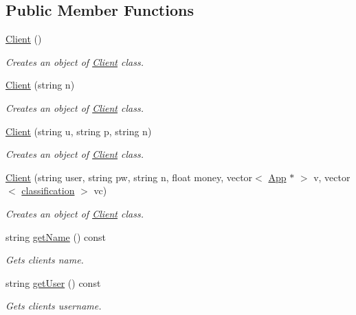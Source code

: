 \subsection*{Public Member Functions}
\begin{DoxyCompactItemize}
\item 
\hyperlink{class_client_ae51af7aa6b8f591496a8f6a4a87a14bf}{Client} ()
\begin{DoxyCompactList}\small\item\em Creates an object of \hyperlink{class_client}{Client} class. \end{DoxyCompactList}\item 
\hyperlink{class_client_aeb5b0cad9e1c7fa265fa2fc5c8811bb5}{Client} (string n)
\begin{DoxyCompactList}\small\item\em Creates an object of \hyperlink{class_client}{Client} class. \end{DoxyCompactList}\item 
\hyperlink{class_client_a937ad40db78ba6c93e742c593cf63132}{Client} (string u, string p, string n)
\begin{DoxyCompactList}\small\item\em Creates an object of \hyperlink{class_client}{Client} class. \end{DoxyCompactList}\item 
\hyperlink{class_client_a39726efcaba3fa92c1f05aa4b07b6694}{Client} (string user, string pw, string n, float money, vector$<$ \hyperlink{class_app}{App} $\ast$ $>$ v, vector$<$ \hyperlink{structclassification}{classification} $>$ vc)
\begin{DoxyCompactList}\small\item\em Creates an object of \hyperlink{class_client}{Client} class. \end{DoxyCompactList}\item 
string \hyperlink{class_client_a28a677584ad4793b50b31c2e75039e2c}{get\-Name} () const 
\begin{DoxyCompactList}\small\item\em Gets clients name. \end{DoxyCompactList}\item 
string \hyperlink{class_client_a0e00ab51be9a72d8ed059c864fbcc095}{get\-User} () const 
\begin{DoxyCompactList}\small\item\em Gets clients username. \end{DoxyCompactList}\item 

\end{DoxyCompactItemize}
